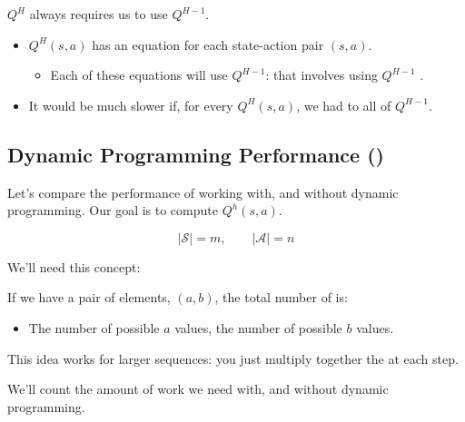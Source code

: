         $Q^H$ always requires us to use $Q^{H-1}$.

        \begin{itemize}
            \item $Q^H(s,a)$ has an equation for each state-action pair $(s,a)$. 
            
            \begin{itemize}
                \item Each of these equations will use $Q^{H-1}$: that involves using $Q^{H-1}$ .
            \end{itemize}
            
            \item It would be much slower if, for every $Q^H(s,a)$, we had to  all of $Q^{H-1}$.
        \end{itemize}



    \pagebreak

    \subsection{Dynamic Programming Performance ()}

        Let's compare the performance of working with, and without dynamic programming. Our goal is to compute $Q^h(s,a)$.

        \begin{equation}
            |\mathcal{S}|=m, \qquad |\mathcal{A}|=n
        \end{equation}

        We'll need this concept:\\

        \begin{concept}
            If we have a pair of elements, $(a,b)$, the total number of  is:

            \begin{itemize}
                \item The number of possible $a$ values,  the number of possible $b$ values.
            \end{itemize}

            This idea works for larger sequences: you just multiply together the  at each step.
        \end{concept}

        We'll count the amount of work we need with, and without dynamic programming.


